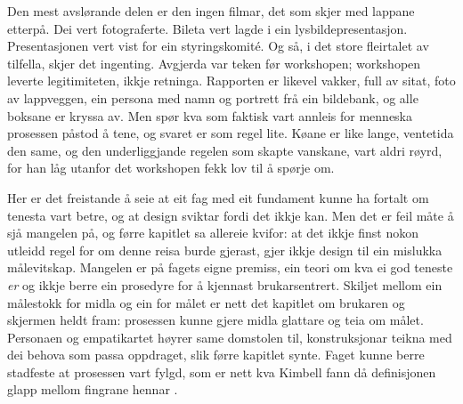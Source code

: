 Den mest avslørande delen er den ingen filmar, det som skjer med lappane etterpå. Dei vert fotograferte. Bileta vert lagde i ein lysbildepresentasjon. Presentasjonen vert vist for ein styringskomité. Og så, i det store fleirtalet av tilfella, skjer det ingenting. Avgjerda var teken før workshopen; workshopen leverte legitimiteten, ikkje retninga. Rapporten er likevel vakker, full av sitat, foto av lappveggen, ein persona med namn og portrett frå ein bildebank, og alle boksane er kryssa av. Men spør kva som faktisk vart annleis for menneska prosessen påstod å tene, og svaret er som regel lite. Køane er like lange, ventetida den same, og den underliggjande regelen som skapte vanskane, vart aldri røyrd, for han låg utanfor det workshopen fekk lov til å spørje om.

Her er det freistande å seie at eit fag med eit fundament kunne ha fortalt om tenesta vart betre, og at design sviktar fordi det ikkje kan. Men det er feil måte å sjå mangelen på, og førre kapitlet sa allereie kvifor: at det ikkje finst nokon utleidd regel for om denne reisa burde gjerast, gjer ikkje design til ein mislukka målevitskap. Mangelen er på fagets eigne premiss, ein teori om kva ei god teneste \emph{er} og ikkje berre ein prosedyre for å kjennast brukarsentrert. Skiljet mellom ein målestokk for midla og ein for målet er nett det kapitlet om brukaren og skjermen heldt fram: prosessen kunne gjere midla glattare og teia om målet. Personaen og empatikartet høyrer same domstolen til, konstruksjonar teikna med dei behova som passa oppdraget, slik førre kapitlet synte. Faget kunne berre stadfeste at prosessen vart fylgd, som er nett kva Kimbell fann då definisjonen glapp mellom fingrane hennar \autocite{kimbell2011}.


